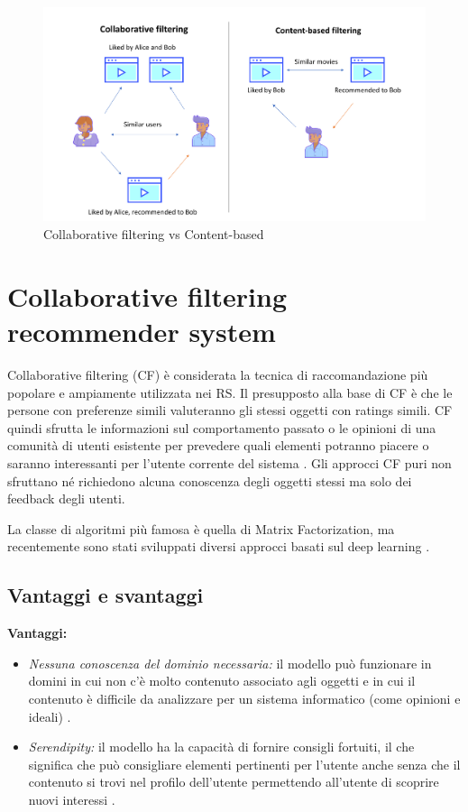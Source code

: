 \documentclass[12pt,italian]{report}
\begin{document}
\begin{figure}
  \includegraphics[width=\linewidth]{immagini/cb_cf_schema.png}
  \caption{Collaborative filtering vs Content-based}
  \label{fig:cb-cf}
\end{figure}



\section{Collaborative filtering recommender system}
Collaborative filtering (CF) è considerata la tecnica di raccomandazione più popolare e ampiamente utilizzata nei RS. Il presupposto alla base di CF è che le persone con preferenze simili valuteranno gli stessi oggetti con ratings simili. CF quindi sfrutta le informazioni sul comportamento passato o le opinioni di una comunità di utenti esistente per prevedere quali elementi potranno piacere o saranno interessanti per l'utente corrente del sistema \cite{recsys-intro}. Gli approcci CF puri non sfruttano né richiedono alcuna conoscenza degli oggetti stessi ma solo dei feedback degli utenti.

La classe di algoritmi più famosa è quella di Matrix Factorization, ma recentemente sono stati sviluppati diversi approcci basati sul deep learning \cite{deep-learning-survey}.

\subsection{Vantaggi e svantaggi} \label{ssec:pros-cons-cf}
\textbf{Vantaggi:}
\begin{itemize}

 \item \textit{Nessuna conoscenza del dominio necessaria:} il modello può funzionare in domini in cui non c'è molto contenuto associato agli oggetti e in cui il contenuto è difficile da analizzare per un sistema informatico (come opinioni e ideali) \cite{recsys-principle-methods-evaluation}.
 
 \item \textit{Serendipity:} il modello ha la capacità di fornire consigli fortuiti, il che significa che può consigliare elementi pertinenti per l'utente anche senza che il contenuto si trovi nel profilo dell'utente permettendo all'utente di scoprire nuovi interessi \cite{recsys-principle-methods-evaluation} \cite{cf-advantages-google}.
\end{itemize}
\end{document}
